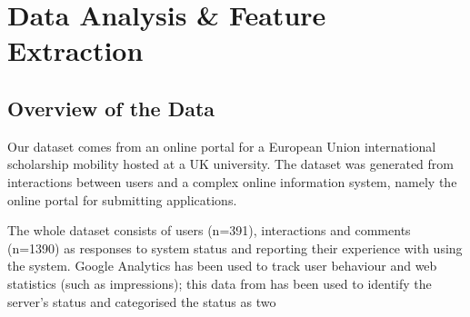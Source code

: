 \documentclass[graybox]{svmult}
\begin{document}
\section{Data Analysis \& Feature Extraction}\label{dataanalysis}

\subsection{Overview of the Data}

Our dataset comes from an online portal for a European Union 
international scholarship mobility hosted at a UK university. The
dataset was generated from interactions between users and a complex
online information system, namely the online portal for submitting
applications.

The whole dataset consists of users (n=391), interactions and comments
(n=1390) as responses to system status and reporting their experience
with using the system. Google Analytics has been used to track user behaviour
and web statistics (such as impressions); this data from has been used
to identify the server's status and categorised the status as two
\end{document}
